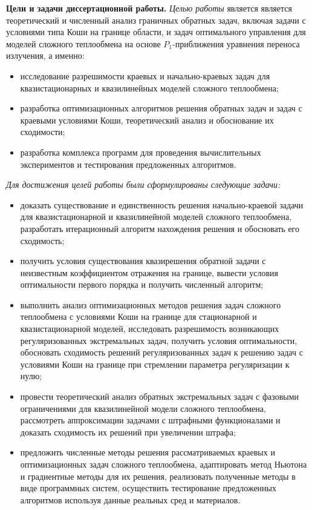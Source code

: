     \textbf{Цели и задачи диссертационной работы.}
    \textit{Целью работы} является является теоретический и численный анализ граничных
    обратных задач, включая задачи с условиями типа Коши на границе области,
    и задач оптимального управления для моделей сложного теплообмена на
    основе $P_1$-приближения уравнения переноса излучения, а именно:
    \begin{itemize}[leftmargin=5.5mm]
        \renewcommand\labelitemi{--}
        \item исследование разрешимости краевых и начально-краевых задач для
        квазистационарных и квазилинейных моделей сложного теплообмена;
        \item разработка оптимизационных алгоритмов решения обратных задач и задач
        с краевыми условиями Коши, теоретический анализ и обоснование их
        сходимости;
        \item разработка комплекса программ для проведения вычислительных
        экспериментов и тестирования предложенных алгоритмов.
    \end{itemize}
    \textit{Для достижения целей работы были сформулированы следующие задачи:}
    \begin{itemize}[leftmargin=5.5mm]
        \renewcommand\labelitemi{--}
        \item доказать существование и единственность решения начально-краевой
        задачи для квазистационарной и квазилинейной моделей сложного теплообмена,
        разработать итерационный алгоритм нахождения решения и обосновать его
        сходимость;
        \item получить условия существования квазирешения обратной задачи с
        неизвестным коэффициентом отражения на границе, вывести условия
        оптимальности первого порядка и получить численный алгоритм;
        \item выполнить анализ оптимизационных методов решения задач сложного
        теплообмена с условиями Коши на границе для стационарной и
        квазистационарной моделей, исследовать разрешимость возникающих
        регуляризованных экстремальных задач, получить условия оптимальности,
        обосновать сходимость решений регуляризованных задач к решению задач с
        условиями Коши на границе при стремлении параметра регуляризации к
        нулю;
        \item провести теоретический анализ обратных экстремальных задач с фазовыми
        ограничениями для квазилинейной модели сложного теплообмена,
        рассмотреть аппроксимации задачами с штрафными функционалами и
        доказать сходимость их решений при увеличении штрафа;
        \item предложить численные методы решения рассматриваемых краевых и
        оптимизационных задач сложного теплообмена, адаптировать метод
        Ньютона и градиентные методы для их решения, реализовать полученные
        методы в виде программных систем, осуществить тестирование
        предложенных алгоритмов используя данные реальных сред и материалов.
    \end{itemize}


